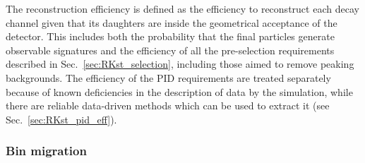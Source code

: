 The reconstruction efficiency is defined as the efficiency to reconstruct
each decay channel given that its daughters are inside the geometrical acceptance
of the detector. This includes both the probability that the final particles generate
observable signatures and the efficiency of all the pre-selection requirements described
in Sec.~\ref{sec:RKst_selection}, including those aimed to remove peaking backgrounds. 
The efficiency of the PID requirements are treated separately because of known deficiencies in the description 
of data by the simulation, while there are reliable data-driven methods which can be used to 
extract it (see Sec.~\ref{sec:RKst_pid_eff}).

\subsubsection{Bin migration}

